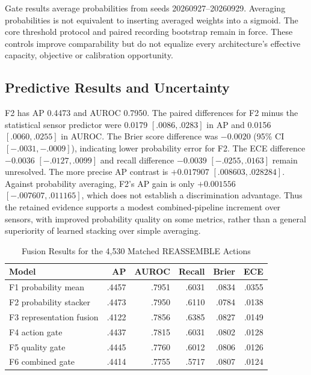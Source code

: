 Gate results average probabilities from seeds 20260927--20260929. Averaging probabilities is not equivalent to inserting averaged weights into a sigmoid. The core threshold protocol and paired recording bootstrap remain in force. These controls improve comparability but do not equalize every architecture's effective capacity, objective or calibration opportunity.

\subsection{Predictive Results and Uncertainty}
F2 has AP 0.4473 and AUROC 0.7950. The paired differences for F2 minus the statistical sensor predictor were 0.0179 $[.0086,.0283]$ in AP and 0.0156 $[.0060,.0255]$ in AUROC. The Brier score difference was $-0.0020$ (95\% CI $[-.0031,-.0009]$), indicating lower probability error for F2. The ECE difference $-0.0036$ $[-.0127,.0099]$ and recall difference $-0.0039$ $[-.0255,.0163]$ remain unresolved. The more precise AP contrast is $+0.017907$ $[.008603,.028284]$. Against probability averaging, F2's AP gain is only $+0.001556$ $[-.007607,.011165]$, which does not establish a discrimination advantage. Thus the retained evidence supports a modest combined-pipeline increment over sensors, with improved probability quality on some metrics, rather than a general superiority of learned stacking over simple averaging.

\begin{table}[htbp]
\caption{Fusion Results for the 4,530 Matched REASSEMBLE Actions}\label{tab:reassemble-fusion}
\centering\small

\begin{tabular}{lrrrrr}\hline
Model & AP & AUROC & Recall & Brier & ECE\\\hline
F1 probability mean & .4457 & .7951 & .6031 & .0834 & .0355\\
F2 probability stacker & .4473 & .7950 & .6110 & .0784 & .0138\\
F3 representation fusion & .4122 & .7856 & .6385 & .0827 & .0149\\
F4 action gate & .4437 & .7815 & .6031 & .0802 & .0128\\
F5 quality gate & .4445 & .7760 & .6012 & .0806 & .0126\\
F6 combined gate & .4414 & .7755 & .5717 & .0807 & .0124\\\hline
\end{tabular}
\end{table}

